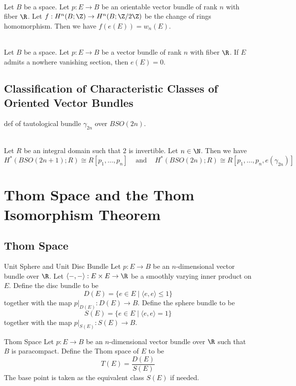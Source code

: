 \documentclass[a4paper]{article}
\begin{document}
\begin{prp}{}{}\\
Let $B$ be a space. Let $p:E\to B$ be an orientable vector bundle of rank $n$ with fiber $\R$. Let $f:H^n(B;\Z)\to H^n(B;\Z/2\Z)$ be the change of rings homomorphism. Then we have $f(e(E))=w_n(E)$. 
\end{prp}

\begin{prp}{}{}\\
Let $B$ be a space. Let $p:E\to B$ be a vector bundle of rank $n$ with fiber $\R$. If $E$ admits a nowhere vanishing section, then $e(E)=0$. 
\end{prp}

\subsection{Classification of Characteristic Classes of Oriented Vector Bundles}
def of tautological bundle $\gamma_{2n}$ over $BSO(2n)$. 

\begin{prp}{}{}\\
Let $R$ be an integral domain such that $2$ is invertible. Let $n\in\N$. Then we have $$H^\ast(BSO(2n+1);R)\cong R[p_1,\dots,p_n]\;\;\;\text{ and }\;\;\;H^\ast(BSO(2n);R)\cong R[p_1,\dots,p_n,e(\gamma_{2n})]$$
\end{prp}

\pagebreak
\section{Thom Space and the Thom Isomorphism Theorem}
\subsection{Thom Space}
\begin{defn}{Unit Sphere and Unit Disc Bundle}{} Let $p:E\to B$ be an $n$-dimensional vector bundle over $\R$. Let $\langle-,-\rangle:E\times E\to\R$ be a smoothly varying inner product on $E$. Define the disc bundle to be $$D(E)=\{e\in E\;|\;\langle e,e\rangle\leq 1\}$$ together with the map $p|_{D(E)}:D(E)\to B$. Define the sphere bundle to be $$S(E)=\{e\in E\;|\;\langle e,e\rangle=1\}$$ together with the map $p|_{S(E)}:S(E)\to B$. 
\end{defn}

\begin{defn}{Thom Space}{} Let $p:E\to B$ be an $n$-dimensional vector bundle over $\R$ such that $B$ is paracompact. Define the Thom space of $E$ to be $$T(E)=\frac{D(E)}{S(E)}$$ The base point is taken as the equivalent class $S(E)$ if needed. 
\end{defn}
\end{document}
